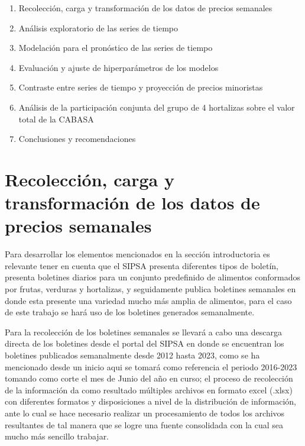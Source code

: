\documentclass[
]{book}
\providecommand{\tightlist}{%
  \setlength{\itemsep}{0pt}\setlength{\parskip}{0pt}}
\begin{document}
\begin{enumerate}
\def\labelenumi{\arabic{enumi}.}
\tightlist
\item
  Recolección, carga y transformación de los datos de precios semanales
\item
  Análisis exploratorio de las series de tiempo
\item
  Modelación para el pronóstico de las series de tiempo
\item
  Evaluación y ajuste de hiperparámetros de los modelos
\item
  Contraste entre series de tiempo y proyección de precios minoristas
\item
  Análisis de la participación conjunta del grupo de 4 hortalizas sobre el valor total de la CABASA
\item
  Conclusiones y recomendaciones
\end{enumerate}

\hypertarget{recolecciuxf3n-carga-y-transformaciuxf3n-de-los-datos-de-precios-semanales}{%
\chapter{Recolección, carga y transformación de los datos de precios semanales}\label{recolecciuxf3n-carga-y-transformaciuxf3n-de-los-datos-de-precios-semanales}}

Para desarrollar los elementos mencionados en la sección introductoria es relevante tener en cuenta que el SIPSA presenta diferentes tipos de boletín, presenta boletines diarios para un conjunto predefinido de alimentos conformados por frutas, verduras y hortalizas, y seguidamente publica boletines semanales en donde esta presente una variedad mucho más amplia de alimentos, para el caso de este trabajo se hará uso de los boletines generados semanalmente.

Para la recolección de los boletines semanales se llevará a cabo una descarga directa de los boletines desde el portal del SIPSA en donde se encuentran los boletines publicados semanalmente desde 2012 hasta 2023, como se ha mencionado desde un inicio aqui se tomará como referencia el periodo 2016-2023 tomando como corte el mes de Junio del año en curso; el proceso de recolección de la información da como resultado múltiples archivos en formato excel (.xlsx) con diferentes formatos y disposiciones a nivel de la distribución de información, ante lo cual se hace necesario realizar un procesamiento de todos los archivos resultantes de tal manera que se logre una fuente consolidada con la cual sea mucho más sencillo trabajar.
\end{document}
